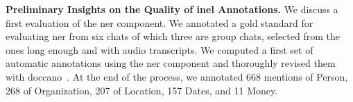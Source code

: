 

\textbf{Preliminary Insights on the Quality of \ac{inel} Annotations.}
We discuss a first evaluation of the \ac{ner} component. 
We annotated a gold standard for evaluating \ac{ner} from six chats of which three are group chats, selected from the ones long enough and with audio transcripts. %
We computed a first set of automatic annotations using the \ac{ner} component and thoroughly revised them with doccano~\cite{doccano}. At the end of the process, we annotated 668 mentions of Person, 268 of Organization, 207 of Location, 157 Dates, and 11 Money.

